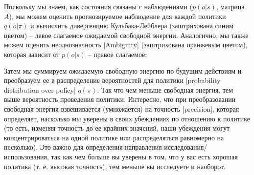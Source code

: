 \documentclass[twoside,leqno, 11pt]{article}
\begin{document}
	Поскольку мы знаем, как состояния связаны с наблюдениями ($p(o|s)$, матрица $A$), мы можем оценить прогнозируемое наблюдение для каждой политики $q(o|\pi)$ и вычислить дивергенцию Кульбака-Лейблера (заштрихована синим цветом) -- левое слагаемое ожидаемой свободной энергии. Аналогично, мы также можем оценить неоднозначность [Ambiguity] (заштрихована оранжевым цветом), которая зависит от $p(o|s)$ -- правое слагаемое:
	
	\newpage
	
	\begin{figure}[h]
	\end{figure}
	
	
	Затем мы суммируем ожидаемую свободную энергию по будущим действиям и преобразуем ее в распределение вероятностей для политики [probability distribution over policy] $q(\pi)$. Так что чем меньше свободная энергия, тем выше вероятность проведения политики. Интересно, что при преобразовании свободная энергия взвешивается (умножается) на точность [precision], которая определяет, насколько мы уверены в своих убеждениях по отношению к политике (то есть, изменяя точность до ее крайних значений, наши убеждения могут концентрироваться на одной политике или распределяться равномерно на несколько). Это важно для определения направления исследования/использования, так как чем больше вы уверены в том, что у вас есть хорошая политика (т. е. высокая точность), тем меньше вы исследуете и наоборот.
	
\end{document}
